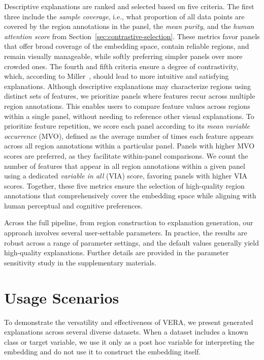 \documentclass[lettersize,journal]{IEEEtran}
\begin{document}
Descriptive explanations are ranked and selected based on five criteria.
The first three include the \textit{sample coverage}, i.e., what proportion of all data points are covered by the region annotations in the panel, the \textit{mean purity}, and the \textit{human attention score} from Section~\ref{sec:contrastive-selection}.
These metrics favor panels that offer broad coverage of the embedding space, contain reliable regions, and remain visually manageable, while softly preferring simpler panels over more crowded ones.
The fourth and fifth criteria ensure a degree of contrastivity, which, according to Miller~\cite{Miller2019}, should lead to more intuitive and satisfying explanations.
Although descriptive explanations may characterize regions using distinct sets of features, we prioritize panels where features recur across multiple region annotations. This enables users to compare feature values across regions within a single panel, without needing to reference other visual explanations.
To prioritize feature repetition, we score each panel according to its \textit{mean variable occurrence} (MVO), defined as the average number of times each feature appears across all region annotations within a particular panel.
Panels with higher MVO scores are preferred, as they facilitate within-panel comparisons.
We count the number of features that appear in all region annotations within a given panel using a dedicated \textit{variable in all} (VIA) score, favoring panels with higher VIA scores.
Together, these five metrics ensure the selection of high-quality region annotations that comprehensively cover the embedding space while aligning with human perceptual and cognitive preferences.

Across the full pipeline, from region construction to explanation generation, our approach involves several user-settable parameters. In practice, the results are robust across a range of parameter settings, and the default values generally yield high-quality explanations. Further details are provided in the parameter sensitivity study in the supplementary materials.


\section{Usage Scenarios}
\label{sec:case-studies}

To demonstrate the versatility and effectiveness of VERA, we present generated explanations across several diverse datasets. When a dataset includes a known class or target variable, we use it only as a post hoc variable for interpreting the embedding and do not use it to construct the embedding itself.
\end{document}
